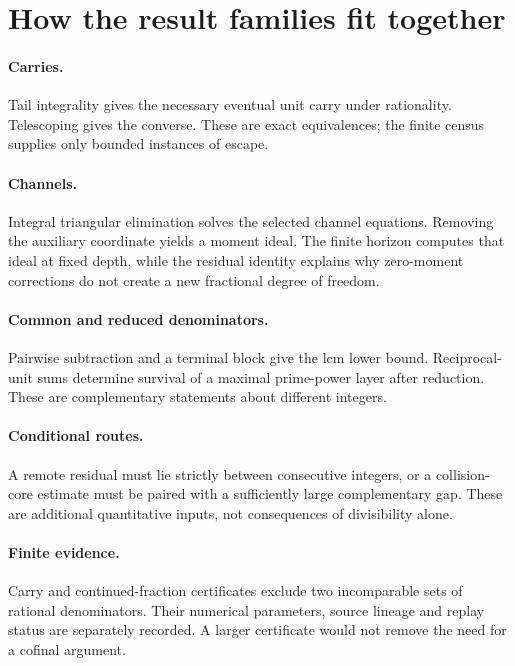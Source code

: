 \clearpage
\section{How the result families fit together}\label{sec:erdos-68-complete-family-map}
\paragraph{Carries.} Tail integrality gives the necessary eventual unit
carry under rationality.  Telescoping gives the converse.  These are exact
equivalences; the finite census supplies only bounded instances of escape.

\paragraph{Channels.} Integral triangular elimination solves the selected
channel equations.  Removing the auxiliary coordinate yields a moment
ideal.  The finite horizon computes that ideal at fixed depth, while the
residual identity explains why zero-moment corrections do not create a
new fractional degree of freedom.

\paragraph{Common and reduced denominators.} Pairwise subtraction and a
terminal block give the lcm lower bound.  Reciprocal-unit sums determine
survival of a maximal prime-power layer after reduction.  These are
complementary statements about different integers.

\paragraph{Conditional routes.} A remote residual must lie strictly
between consecutive integers, or a collision-core estimate must be paired
with a sufficiently large complementary gap.  These are additional
quantitative inputs, not consequences of divisibility alone.

\paragraph{Finite evidence.} Carry and continued-fraction certificates
exclude two incomparable sets of rational denominators.  Their numerical
parameters, source lineage and replay status are separately recorded.
A larger certificate would not remove the need for a cofinal argument.


